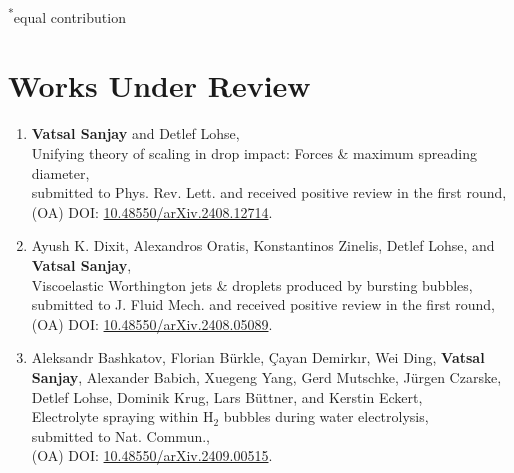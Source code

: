 \documentclass[11pt,a4paper,roman,english,colorlinks,linkcolor={red!50!black}]{moderncv}
\begin{document}
\footnotesize
\textsuperscript{*}equal contribution
\normalsize

\section{\textbf{Works Under Review}}

\begin{enumerate}[leftmargin=0.75cm]
	\item \textbf{Vatsal Sanjay} and Detlef Lohse,\\
	Unifying theory of scaling in drop impact: Forces \& maximum spreading diameter,\\
	submitted to Phys. Rev. Lett. and received positive review in the first round,\\
	(OA) DOI: \href{https://doi.org/10.48550/arXiv.2408.12714}{10.48550/arXiv.2408.12714}.

	\item Ayush K. Dixit, Alexandros Oratis, Konstantinos Zinelis, Detlef Lohse, and \textbf{Vatsal Sanjay},\\
	Viscoelastic Worthington jets \& droplets produced by bursting bubbles,\\
	submitted to J. Fluid Mech. and received positive review in the first round,\\
	(OA) DOI: \href{https://doi.org/10.48550/arXiv.2408.05089}{10.48550/arXiv.2408.05089}.

	\item Aleksandr Bashkatov, Florian Bürkle, Çayan Demirkır, Wei Ding, \textbf{Vatsal Sanjay}, Alexander Babich, Xuegeng Yang, Gerd Mutschke, Jürgen Czarske, Detlef Lohse, Dominik Krug, Lars Büttner, and Kerstin Eckert,\\
	Electrolyte spraying within H$_2$ bubbles during water electrolysis,\\
	submitted to Nat. Commun.,\\
	(OA) DOI: \href{https://doi.org/10.48550/arXiv.2409.00515}{10.48550/arXiv.2409.00515}.

\end{enumerate}
\end{document}

